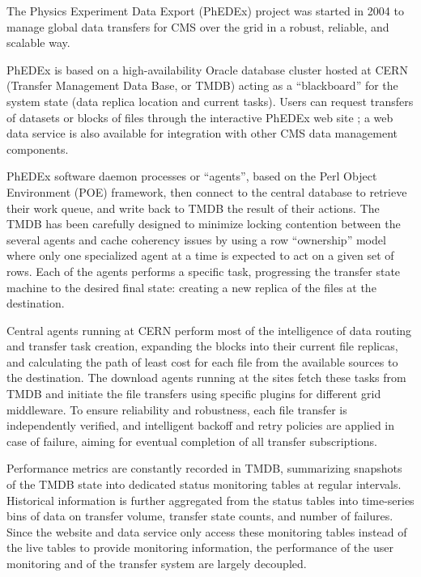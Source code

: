 The Physics Experiment Data Export (PhEDEx) \cite{PhEDEx} project was started in 2004 to manage global data transfers for CMS over the grid in a robust, reliable, and scalable way.

PhEDEx is based on a high-availability Oracle database cluster hosted at CERN (Transfer Management Data Base, or TMDB) acting as a ``blackboard'' for the system state (data replica location and current tasks). Users can request transfers of datasets or blocks of files through the interactive PhEDEx web site \cite{phedexweb}; a web data service \cite{phedexdatasvc} is also available for integration with other CMS data management components.

PhEDEx software daemon processes or ``agents'', based on the Perl Object Environment (POE) framework, then  connect to the central database to retrieve their work queue, and write back to TMDB the result of their actions.
The TMDB has been carefully designed to minimize locking contention between the several agents and cache
coherency issues by using a row ``ownership'' model where only one specialized agent at a time is expected to act on a given set of rows.
Each of the agents performs a specific task, progressing the transfer state machine to the desired final state: creating a new replica of the files at the destination.

Central agents running at CERN perform most of the intelligence of data routing and transfer task creation, expanding the blocks into their current file replicas, and calculating the path of least cost for each file from the available sources to the destination.
The download agents running at the sites fetch these tasks from TMDB and initiate the file transfers using specific plugins
for different grid middleware. To ensure reliability and robustness, each file transfer is independently verified, and intelligent backoff and retry policies are applied in case of failure, aiming for eventual completion of all transfer subscriptions.

Performance metrics are constantly recorded in TMDB, summarizing snapshots of the TMDB state into dedicated status monitoring tables at regular intervals. Historical information is further aggregated from the status tables into time-series bins of data on transfer volume, transfer state counts, and number of failures. Since the website and data service only access these monitoring tables instead of the live tables to provide monitoring information, the performance of the user monitoring and of the transfer system are largely decoupled.

